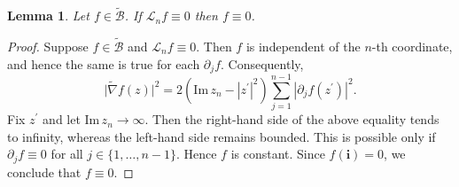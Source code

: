 \documentclass{amsart}
\newtheorem{lemma}[theorem]{Lemma}
\numberwithin{equation}{section}
\newcommand{\ImPt}{\mathrm{Im}\,}
\newcommand{\bfL}{\mathcal{L}}
\newcommand{\calU}{\mathcal{U}}
\newcommand{\bfi}{\mathbf{i}}
\newcommand{\calB}{\mathcal{B}}
\begin{document}
\begin{lemma}\label{lem:uniq_n}
Let $f\in \widetilde{\calB}$. If $\bfL_n f\equiv 0$ then $f\equiv 0$.
\end{lemma}
\begin{proof}
 Suppose $f\in \widetilde{\calB}$ and $\bfL_n f\equiv 0$. Then $f$ is independent of the $n$-th coordinate, and hence the same is true for each $\partial_j f$.
Consequently,
\begin{equation*}\label{eqn:partial_nf}
\big|\widetilde{\nabla} f(z)\big|^2 = 2 \left(\ImPt z_n-|z^{\prime}|^2\right)
\sum_{j=1}^{n-1} \left|\partial_j f(z^{\prime})\right|^2.
\end{equation*}
Fix $z^{\prime}$ and let  $\ImPt z_n\to\infty$.
Then the right-hand side of the above equality tends to infinity, whereas the left-hand side remains bounded.
This is possible only if $\partial_j f \equiv 0$ for all $j\in \{1,\ldots,n-1\}$. 
Hence $f$ is constant. Since $f(\bfi)=0$, we conclude that $f\equiv 0$.
\end{proof}

\end{document}
